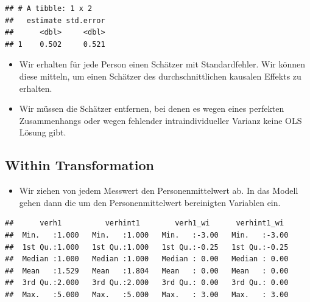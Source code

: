 \documentclass[
]{book}
\newenvironment{Shaded}{\begin{snugshade}}{\end{snugshade}}
\newcommand{\DataTypeTok}[1]{\textcolor[rgb]{0.13,0.29,0.53}{#1}}
\newcommand{\KeywordTok}[1]{\textcolor[rgb]{0.13,0.29,0.53}{\textbf{#1}}}
\newcommand{\NormalTok}[1]{#1}
\newcommand{\OperatorTok}[1]{\textcolor[rgb]{0.81,0.36,0.00}{\textbf{#1}}}
\newcommand{\StringTok}[1]{\textcolor[rgb]{0.31,0.60,0.02}{#1}}
\providecommand{\tightlist}{%
  \setlength{\itemsep}{0pt}\setlength{\parskip}{0pt}}
\begin{document}
\begin{verbatim}
## # A tibble: 1 x 2
##   estimate std.error
##      <dbl>     <dbl>
## 1    0.502     0.521
\end{verbatim}

\begin{itemize}
\tightlist
\item
  Wir erhalten für jede Person einen Schätzer mit Standardfehler. Wir können diese mitteln, um einen Schätzer des durchschnittlichen kausalen Effekts zu erhalten.
\item
  Wir müssen die Schätzer entfernen, bei denen es wegen eines perfekten Zusammenhangs oder wegen fehlender intraindividueller Varianz keine OLS Lösung gibt.
\end{itemize}

\hypertarget{within-transformation}{%
\subsection*{Within Transformation}\label{within-transformation}}

\begin{itemize}
\tightlist
\item
  Wir ziehen von jedem Messwert den Personenmittelwert ab. In das Modell gehen dann die um den Personenmittelwert bereinigten Variablen ein.
\end{itemize}

\begin{Shaded}
\end{Shaded}

\begin{verbatim}
##      verh1          verhint1        verh1_wi      verhint1_wi   
##  Min.   :1.000   Min.   :1.000   Min.   :-3.00   Min.   :-3.00  
##  1st Qu.:1.000   1st Qu.:1.000   1st Qu.:-0.25   1st Qu.:-0.25  
##  Median :1.000   Median :1.000   Median : 0.00   Median : 0.00  
##  Mean   :1.529   Mean   :1.804   Mean   : 0.00   Mean   : 0.00  
##  3rd Qu.:2.000   3rd Qu.:2.000   3rd Qu.: 0.00   3rd Qu.: 0.00  
##  Max.   :5.000   Max.   :5.000   Max.   : 3.00   Max.   : 3.00
\end{verbatim}
\end{document}
